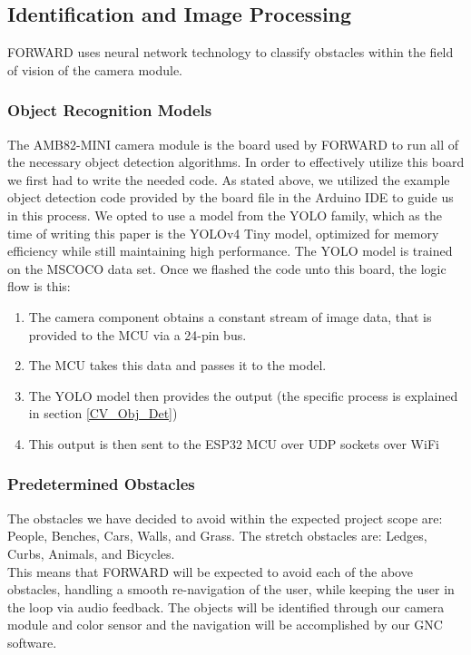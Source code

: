 \subsection{Identification and Image Processing}
\noindent FORWARD uses neural network technology to classify obstacles within the field of vision of the camera module.

\subsubsection{Object Recognition Models}

\noindent The AMB82-MINI camera module is the board used by FORWARD to run all of the necessary object detection algorithms. In order to effectively utilize this board we first had to write the needed code. As stated above, we utilized the example object detection code provided by the board file in the Arduino IDE to guide us in this process. We opted to use a model from the YOLO family, which as the time of writing this paper is the YOLOv4 Tiny model, optimized for memory efficiency while still maintaining high performance. The YOLO model is trained on the MSCOCO data set. Once we flashed the code unto this board, the logic flow is this: 

\begin{enumerate}
	\item The camera component obtains a constant stream of image data, that is provided to the MCU via a 24-pin bus.
	\item The MCU takes this data and passes it to the model.
	\item The YOLO model then provides the output (the specific process is explained in section \ref{CV_Obj_Det})
	\item This output is then sent to the ESP32 MCU over UDP sockets over WiFi
\end{enumerate}
 

\subsubsection{Predetermined Obstacles}
\noindent The obstacles we have decided to avoid within the expected project scope are: People, Benches, Cars, Walls, and Grass. The stretch obstacles are: Ledges, Curbs, Animals, and Bicycles.\\

\noindent This means that FORWARD will be expected to avoid each of the above obstacles, handling a smooth re-navigation of the user, while keeping the user in the loop via audio feedback. The objects will be identified through our camera module and color sensor and the navigation will be accomplished by our GNC software. \\